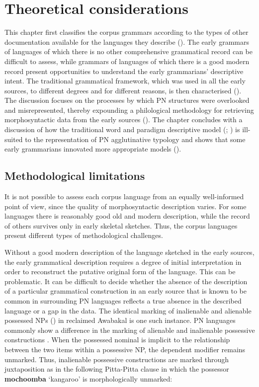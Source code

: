 \chapter{Theoretical considerations}
\label{chap:key:2}
\label{sec:2}
This chapter first classifies the corpus grammars according to the types of other documentation available for the languages they describe (). The early grammars of languages of which there is no other comprehensive grammatical record can be difficult to assess, while grammars of languages of which there is a good modern record present opportunities to understand the early grammarians' descriptive intent. The traditional grammatical framework, which was used in all the early sources, to different degrees and for different reasons, is then characterised (). The discussion focuses on the processes by which PN structures were overlooked and misrepresented, thereby expounding a philological methodology for retrieving morphosyntactic data from the early sources ().
The chapter concludes with a discussion of how the traditional word and paradigm descriptive model (\citealt{hockett_two_1954}; \citealt{robins_1959}) is ill-suited to the representation of PN agglutinative typology and shows that some early grammarians innovated more appropriate models ().

\section{Methodological limitations}
\label{sec:key:2.1}

It is not possible to assess each corpus language from an equally well-informed point of view, since the quality of morphosyntactic description varies. For some languages there is reasonably good old and modern description, while the record of others survives only in early skeletal sketches. Thus, the corpus languages present different types of methodological challenges.

Without a good modern description of the language sketched in the early sources, the early grammatical description requires a degree of initial interpretation in order to reconstruct the putative original form of the language. This can be problematic. It can be difficult to decide whether the absence of the description of a particular grammatical construction in an early source that is known to be common in surrounding PN languages reflects a true absence in the described language or a gap in the data. The identical marking of inalienable and alienable possessed NPs () in reclaimed Awabakal \citep[33]{lissarrague_salvage_2006} is one such instance. PN languages commonly show a difference in the marking of alienable and inalienable possessive constructions \citep[59]{dixon_australian_2002}. When the possessed nominal is implicit to the relationship between the two items within a possessive NP, the dependent modifier remains unmarked. Thus, inalienable possessive constructions are marked through juxtaposition as in the following Pitta-Pitta clause in which the possessor \textbf{mochoomba} `kangaroo' is morphologically unmarked:


